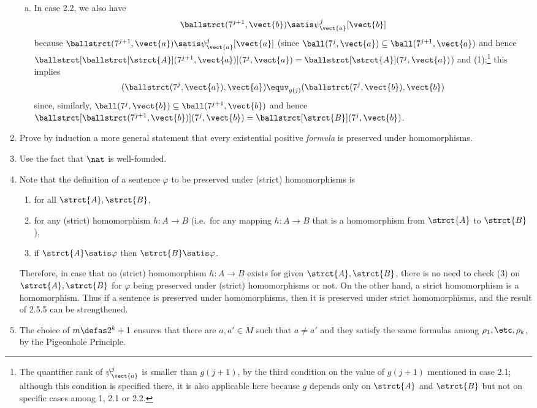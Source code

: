 \begin{enumerate}[1.]
\begin{enumerate}[(a)]
\item In case 2.2, we also have
\[
\ballstrct(7^{j + 1}, \vect{b}) \satis \psi^j_{\vect{a}}[\vect{b}]
\]
because $\ballstrct(7^{j + 1}, \vect{a}) \satis \psi^j_{\vect{a}}[\vect{a}]$ (since $\ball(7^j, \vect{a}) \subseteq \ball(7^{j + 1}, \vect{a})$ and hence $\ballstrct[{\ballstrct[\strct{A}](7^{j + 1}, \vect{a})}](7^j, \vect{a}) = \ballstrct[\strct{A}](7^j, \vect{a})$) and (1);\footnote{The quantifier rank of $\psi^j_{\vect{a}}$ is smaller than $g(j + 1)$, by the third condition on the value of $g(j + 1)$ mentioned in case 2.1; although this condition is specified there, it is also applicable here because $g$ depends only on $\strct{A}$ and $\strct{B}$ but not on specific cases among 1, 2.1 or 2.2.} this implies
\[
(\ballstrct(7^j, \vect{a}), \vect{a}) \equv_{g(j)} (\ballstrct(7^j, \vect{b}), \vect{b})
\]
since, similarly, $\ball(7^j, \vect{b}) \subseteq \ball(7^{j + 1}, \vect{b})$ and hence $\ballstrct[\ballstrct(7^{j + 1}, \vect{b})](7^j, \vect{b}) = \ballstrct[\strct{B}](7^j, \vect{b})$.
\end{enumerate}
%
\item {} Prove by induction a more general statement that every existential positive \emph{formula} is preserved under homomorphisms.
%
\item {} Use the fact that $\nat$ is well-founded.
%
\item {} Note that the definition of a sentence $\varphi$ to be preserved under (strict) homomorphisms is
\begin{enumerate}[(1)]
\item for all $\strct{A}, \strct{B}$,
\item for any (strict) homomorphism $h: A \to B$ (i.e.\ for any mapping $h: A \to B$ that is a homomorphism from $\strct{A}$ to $\strct{B}$),
\item if $\strct{A} \satis \varphi$ then $\strct{B} \satis \varphi$.
\end{enumerate}
Therefore, in case that no (strict) homomorphism $h: A \to B$ exists for given $\strct{A}, \strct{B}$, there is no need to check (3) on $\strct{A}, \strct{B}$ for $\varphi$ being preserved under (strict) homomorphisms or not.
\newpar
On the other hand, a strict homomorphism is a homomorphism. Thus if a sentence is preserved under homomorphisms, then it is preserved under strict homomorphisms, and the result of 2.5.5 can be strengthened.
%
\item {} The choice of $m \defas 2^k + 1$ ensures that there are $a, a' \in M$ such that $a \neq a'$ and they satisfy the same formulas among $\rho_1, \etc, \rho_k$, by the Pigeonhole Principle.
%
\end{enumerate}
